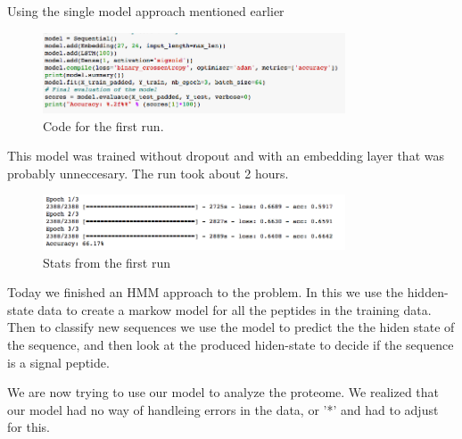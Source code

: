 \documentclass[a4paper]{tufte-handout}
\begin{document}

Using the single model approach mentioned earlier

\begin{figure}
    \begin{center}
      \includegraphics[width=0.8\textwidth]{pics/code_run_1.png}
    \end{center}
    \caption{Code for the first run.}
\end{figure}

This model was trained without dropout and with an embedding layer that was probably unneccesary.
The run took about 2 hours.

\begin{figure}
    \begin{center}
      \includegraphics[width=0.8\textwidth]{pics/first_run.png}
    \end{center}
    \caption{Stats from the first run}
\end{figure}


Today we finished an HMM approach to the problem. In this we use the
hidden-state data to create a markow model for all the peptides in the training
data. Then to classify new sequences we use the model to predict the the hiden
state of the sequence, and then look at the produced hiden-state to decide if
the sequence is a signal peptide.


We are now trying to use our model to analyze the proteome. We realized that
our model had no way of handleing errors in the data, or '*' and had to adjust
for this. 

\hrulefill



\end{document}
